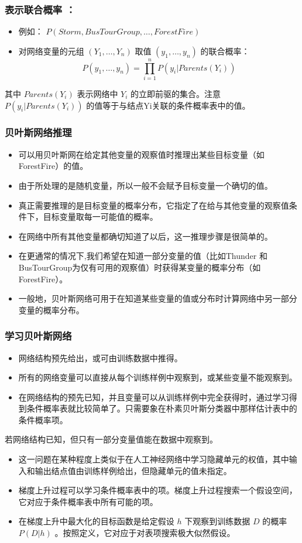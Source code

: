 \documentclass{beamer}
\begin{document}
\begin{frame}
\frametitle{表示联合概率 ：}
\label{sec-8-6}

\begin{itemize}
\item 例如： $P(Storm, BusTourGroup, \ldots, ForestFire)$
\item 对网络变量的元组 $(Y_1, \ldots, Y_n)$ 取值 $(y_1, \ldots, y_n)$ 的联合概率：
   $$P(y_1, \ldots, y_n) = \prod_{i=1}^{n} P(y_i | Parents(Y_i))$$
\end{itemize}
其中 $Parents(Y_i)$ 表示网络中 $Y_i$ 的立即前驱的集合。注意 $P(y_i|Parents(Y_i))$ 的值等于与结点Yi关联的条件概率表中的值。
\end{frame}
\begin{frame}
\frametitle{贝叶斯网络推理}
\label{sec-8-7}


\begin{itemize}
\item 可以用贝叶斯网在给定其他变量的观察值时推理出某些目标变量（如ForestFire）的值。
\item 由于所处理的是随机变量，所以一般不会赋予目标变量一个确切的值。
\item 真正需要推理的是目标变量的概率分布，它指定了在给与其他变量的观察值条件下，目标变量取每一可能值的概率。
\item 在网络中所有其他变量都确切知道了以后，这一推理步骤是很简单的。
\item 在更通常的情况下,我们希望在知道一部分变量的值（比如Thunder 和BusTourGroup为仅有可用的观察值）时获得某变量的概率分布（如ForestFire）。
\item 一般地，贝叶斯网络可用于在知道某些变量的值或分布时计算网络中另一部分变量的概率分布。
\end{itemize}
\end{frame}
\begin{frame}
\frametitle{学习贝叶斯网络}
\label{sec-8-8}


\begin{itemize}
\item 网络结构预先给出，或可由训练数据中推得。
\item 所有的网络变量可以直接从每个训练样例中观察到，或某些变量不能观察到。
\item 在网络结构的预先已知，并且变量可以从训练样例中完全获得时，通过学习得到条件概率表就比较简单了。只需要象在朴素贝叶斯分类器中那样估计表中的条件概率项。
\end{itemize}

若网络结构已知，但只有一部分变量值能在数据中观察到。
\begin{itemize}
\item 这一问题在某种程度上类似于在人工神经网络中学习隐藏单元的权值，其中输入和输出结点值由训练样例给出，但隐藏单元的值未指定。
\item 梯度上升过程可以学习条件概率表中的项。梯度上升过程搜索一个假设空间，它对应于条件概率表中所有可能的项。
\item 在梯度上升中最大化的目标函数是给定假设 $h$ 下观察到训练数据 $D$ 的概率 $P(D|h)$ 。按照定义，它对应于对表项搜索极大似然假设。
\end{itemize}
\end{frame}
\end{document}
